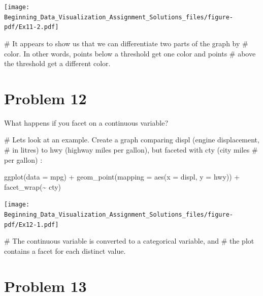 \documentclass[
  letterpaper,
  DIV=11,
  numbers=noendperiod]{scrreprt}
\newenvironment{Shaded}{\begin{snugshade}}{\end{snugshade}}
\newcommand{\AttributeTok}[1]{\textcolor[rgb]{0.40,0.45,0.13}{#1}}
\newcommand{\CommentTok}[1]{\textcolor[rgb]{0.37,0.37,0.37}{#1}}
\newcommand{\FunctionTok}[1]{\textcolor[rgb]{0.28,0.35,0.67}{#1}}
\newcommand{\NormalTok}[1]{\textcolor[rgb]{0.00,0.23,0.31}{#1}}
\newcommand{\SpecialCharTok}[1]{\textcolor[rgb]{0.37,0.37,0.37}{#1}}
\begin{document}
\texttt{[image: Beginning\_Data\_Visualization\_Assignment\_Solutions\_files/figure-pdf/Ex11-2.pdf]}

\begin{Shaded}
\begin{Highlighting}[]
\CommentTok{\# It appears to show us that we can differentiate two parts of the graph by }
\CommentTok{\# color. In other words, points below a threshold get one color and points}
\CommentTok{\# above the threshold get a different color.}
\end{Highlighting}
\end{Shaded}

\section*{Problem 12}\label{problem-12-3}


What happens if you facet on a continuous variable?

\begin{Shaded}
\begin{Highlighting}[]
\CommentTok{\# Let\textquotesingle{}s look at an example. Create a graph comparing displ (engine displacement, }
\CommentTok{\# in litres) to hwy (highway miles per gallon), but faceted with cty (city miles }
\CommentTok{\# per gallon) : }

\FunctionTok{ggplot}\NormalTok{(}\AttributeTok{data =}\NormalTok{ mpg) }\SpecialCharTok{+} 
  \FunctionTok{geom\_point}\NormalTok{(}\AttributeTok{mapping =} \FunctionTok{aes}\NormalTok{(}\AttributeTok{x =}\NormalTok{ displ, }\AttributeTok{y =}\NormalTok{ hwy)) }\SpecialCharTok{+} 
  \FunctionTok{facet\_wrap}\NormalTok{(}\SpecialCharTok{\textasciitilde{}}\NormalTok{ cty)}
\end{Highlighting}
\end{Shaded}

\texttt{[image: Beginning\_Data\_Visualization\_Assignment\_Solutions\_files/figure-pdf/Ex12-1.pdf]}

\begin{Shaded}
\begin{Highlighting}[]
\CommentTok{\# The continuous variable is converted to a categorical variable, and }
\CommentTok{\# the plot contains a facet for each distinct value.}
\end{Highlighting}
\end{Shaded}

\section*{Problem 13}\label{problem-13-3}
\end{document}
